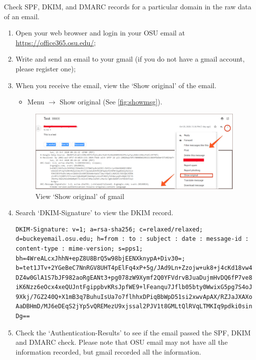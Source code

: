 \documentclass[11pt]{article}
\newcommand{\dmark}{{\sf DMARC}\xspace}
\newcommand{\dkim}{{\sf DKIM}\xspace}
\newcommand{\spf}{{\sf SPF}\xspace}
\begin{document}
Check \spf, \dkim, and \dmark records for a particular domain in the raw data of an email.
\begin{enumerate}
\item Open your web browser and login in your OSU email at \url{https://office365.osu.edu/};
\item Write and send an email to your gmail (if you do not have a gmail account, please register one);
\item When you receive the email, view the ‘Show original’ of the email.
\begin{itemize}
\item Menu $\rightarrow$ Show original (See \autoref{fig:showmsg}).
\end{itemize}

\begin{figure} [h]
\centering
\vspace{-2mm}
\includegraphics[width=0.88\columnwidth]{dkim.pdf}
\caption{View ‘Show original’ of gmail}\label{fig:showmsg}
\end{figure}

\item Search `DKIM-Signature' to view the \dkim record.
\begin{lstlisting}
DKIM-Signature: v=1; a=rsa-sha256; c=relaxed/relaxed; d=buckeyemail.osu.edu; h=from : to : subject : date : message-id : content-type : mime-version; s=pps1; bh=4WreALcxJhhN+epZ8U8BrQ5w98bjEENXknypA+Div30=; b=tet1JTv+2YGeBeC7NnRGV8UHT4pElFq4xP+5g/JAd9Ln+Zzojw+uk8+j4cKd18vw4HUP DZ4w0GlA1S7bJF982aoRgEANt3+pg078zW9Xymf2Q0YFVdrvBJuaDujmHvDQ6fP7ve8d iK6Nzz6eOcx4xeQUJntFgippbvKRsJpfWE9+lFeanqu7Jflb05bty0WwixG5pg7S4oJ+ 9Xkj/7GZ240Q+X1mB3q7BuhuIsUa7o7flhhxDPiqBbWpD51si2xwvApAX/RZJaJXAXoR AaDBHmD/MJ6eDEqS2jYp5vQREMezU9xjssal2PJV1t8GMLtQlRVqLTMKIq9pdki0sin3 Dg==
\end{lstlisting}\vspace{-6mm}

\item Check the `Authentication-Results' to see if the email passed the \spf, \dkim and \dmark check. Please note that OSU email may not have all the information recorded, but gmail recorded all the information.


\end{enumerate}
\end{document}
